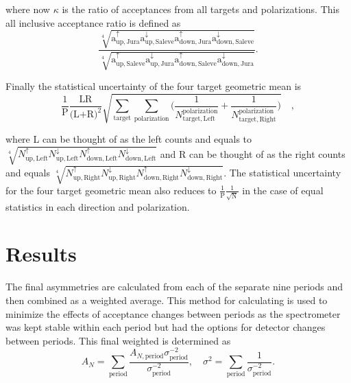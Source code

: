 \noindent
where now $\kappa$ is the ratio of acceptances from all targets and polarizations.  This all inclusive acceptance ratio is defined as
\begin{equation}
  \frac{
    \sqrt[4]{
      \mathrm{a}^{\uparrow}_{\mathrm{up,Jura}}
      \mathrm{a}^{\downarrow}_{\mathrm{up,Saleve}}
      \mathrm{a}^{\uparrow}_{\mathrm{down,Jura}}
      \mathrm{a}^{\downarrow}_{\mathrm{down,Saleve}}}
  }{
    \sqrt[4]{
      \mathrm{a}^{\uparrow}_{\mathrm{up,Saleve}}
      \mathrm{a}^{\downarrow}_{\mathrm{up,Jura}}
      \mathrm{a}^{\uparrow}_{\mathrm{down,Saleve}}
      \mathrm{a}^{\downarrow}_{\mathrm{down,Jura}}}
  }.
\end{equation}

Finally the statistical uncertainty of the four target geometric mean is
\begin{equation}
  \frac{1}{\mathrm{P}}
  \frac{\text{LR}}{\Big( \text{L+R} \Big)^2}
  \sqrt{
    \sum_{\mathrm{target}}\sum_{\mathrm{polarization}}
    \Big(
    \frac{1}{N_{\mathrm{target,Left}}^{\mathrm{polarization}}}
    +
    \frac{1}{N_{\mathrm{target,Right}}^{\mathrm{polarization}}}
    \Big)
  } \quad,
\end{equation}

\noindent
where L can be thought of as the left counts and equals to
$\sqrt[4]{N_{\mathrm{up,Left}}^{\uparrow}N_{\mathrm{up,
      Left}}^{\downarrow}N_{\mathrm{down,Left}}^{\uparrow}N_{\mathrm{down,
      Left}}^{\downarrow}}$ and R can be thought of as the right counts and
equals $\sqrt[4]{N_{\mathrm{up,Right}}^{\uparrow}N_{\mathrm{up,
      Right}}^{\downarrow}N_{\mathrm{down,Right}}^{\uparrow}N_{\mathrm{down,
      Right}}^{\downarrow}}$.  The statistical uncertainty for the four target
geometric mean also reduces to $\frac{1}{\mathrm{P}}\frac{1}{\sqrt{\mathrm{N}}}$
in the case of equal statistics in each direction and polarization.


\section{Results}
The final asymmetries are calculated from each of the separate nine periods and
then combined as a weighted average.  This method for calculating is used to
minimize the effects of acceptance changes between periods as the spectrometer
was kept stable within each period but had the options for detector changes
between periods.  This final weighted is determined as
\begin{equation}
  A_N =
  \sum_{\mathrm{period}}
  \frac{A_{N,\mathrm{period}}\sigma^{-2}_{\mathrm{period}}}{\sigma^{-2}_{\mathrm{period}}},
  \quad \sigma^2 = \sum_{\mathrm{period}} \frac{1}{\sigma^{-2}_{\mathrm{period}}}.
\end{equation}

